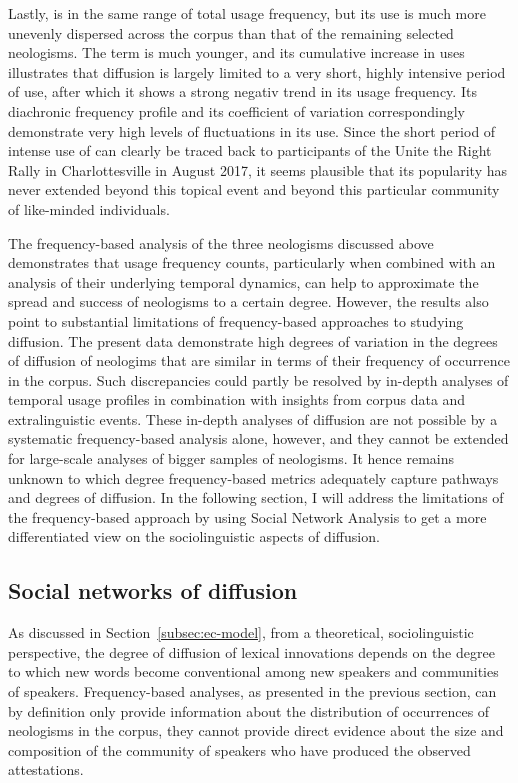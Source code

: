 \documentclass[
  a4paper,
  abstract=on,
  captions=tableabove
  ]{scrartcl}
\begin{document}
        Lastly,  is in the same range of total usage frequency, but its use is much more unevenly dispersed across the corpus than that of the remaining selected neologisms. The term is much younger, and its cumulative increase in uses illustrates that diffusion is largely limited to a very short, highly intensive period of use, after which it shows a strong negativ trend in its usage frequency. Its diachronic frequency profile and its coefficient of variation correspondingly demonstrate very high levels of fluctuations in its use. Since the short period of intense use of  can clearly be traced back to participants of the Unite the Right Rally in Charlottesville in August 2017, it seems plausible that its popularity has never extended beyond this topical event and beyond this particular community of like-minded individuals.
        
        The frequency-based analysis of the three neologisms discussed above demonstrates that usage frequency counts, particularly when combined with an analysis of their underlying temporal dynamics, can help to approximate the spread and success of neologisms to a certain degree. However, the results also point to substantial limitations of frequency-based approaches to studying diffusion. The present data demonstrate high degrees of variation in the degrees of diffusion of neologims that are similar in terms of their frequency of occurrence in the corpus. Such discrepancies could partly be resolved by in-depth analyses of temporal usage profiles in combination with insights from corpus data and extralinguistic events. These in-depth analyses of diffusion are not possible by a systematic frequency-based analysis alone, however, and they cannot be extended for large-scale analyses of bigger samples of neologisms. It hence remains unknown to which degree frequency-based metrics adequately capture pathways and degrees of diffusion. In the following section, I will address the limitations of the frequency-based approach by using Social Network Analysis to get a more differentiated view on the sociolinguistic aspects of diffusion.


  \subsection{Social networks of diffusion}
    \label{subsec:sna}

    As discussed in Section~\ref{subsec:ec-model}, from a theoretical, sociolinguistic perspective, the degree of diffusion of lexical innovations depends on the degree to which new words become conventional among new speakers and communities of speakers. Frequency-based analyses, as presented in the previous section, can by definition only provide information about the distribution of occurrences of neologisms in the corpus, they cannot provide direct evidence about the size and composition of the community of speakers who have produced the observed attestations.
\end{document}
